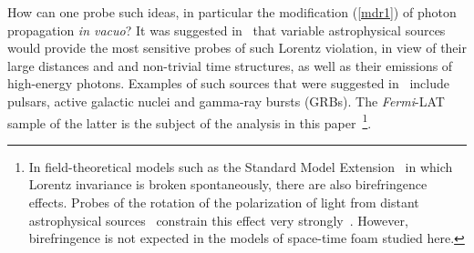 \documentclass[12pt]{article}
\begin{document}
How can one probe such ideas, in particular the modification (\ref{mdr1}) of
photon propagation {\it in vacuo}? It was suggested in~\cite{AEMNS} that variable astrophysical sources
would provide the most sensitive probes of such Lorentz violation, in view of their large distances and
and non-trivial time structures, as well as their emissions of high-energy photons. Examples of such sources
that were suggested in~\cite{AEMNS} include pulsars, active galactic
nuclei and gamma-ray bursts (GRBs). The {\it Fermi}-LAT sample of the latter is the subject of the analysis
in this paper~\footnote{In field-theoretical
models such as the Standard Model Extension~\cite{sme,pospelov,Kost_LV_operators} in which Lorentz invariance is broken
spontaneously, there are also birefringence effects. Probes of the rotation of the polarization of light from distant astrophysical
sources~\cite{bireAngle,GRB_Polal} constrain this effect very strongly~\cite{Stec_Polar,INTEGRAL_Polar,strict_Polar,Lin_Pol,Kislat_Polar}.
However, birefringence is not expected in the models of space-time foam studied here.}.
\end{document}
